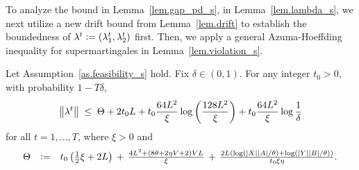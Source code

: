 \documentclass[12pt, final]{l4dc2023}
\begin{document}
To analyze the bound in Lemma~\ref{lem.gap_pd_s},  in Lemma~\ref{lem.lambda_s}, we next utilize a new drift bound from Lemma~\ref{lem.drift} to establish the boundedness of $\lambda^t \mathrel{\mathop:}= (\lambda_1^{t},\lambda_2^{t})$ first. Then, we apply a general Azuma-Hoeffding inequality for supermartingales in Lemma~\ref{lem.violation_s}. 

\begin{lemma}\label{lem.lambda_s}
	Let Assumption~\ref{as.feasibility_s} hold. 
	Fix $\delta\in (0,1)$. For any integer $t_0>0$, with probability $1-T\delta$,
	\[
	\left\|{\lambda^t}\right\| \; \leq\; \displaystyle \Theta + 2 t_0 L+ t_0 \frac{64 L^2}{\xi} \log \left(\frac{128 L^2}{\xi}\right) + t_0 \frac{64 L^2}{\xi} \log\frac{1}{\delta}
	\]
	for all $t = 1,\ldots,T$, where $\xi >0$ and
	\[
	\begin{array}{rcl}
	\Theta &\mathrel{\mathop:}=& t_0
	\left(\tfrac{1}{2}\xi  +2 L\right) \,+\,\tfrac{4L^2 + (8\theta +2\eta V
		+2 )VL}{\xi}
	\,+\,\tfrac{2L (\log(|X||A|/\theta)+\log(|Y||B|/\theta)) }{t_0\xi\eta}.
	\end{array}
	\]
\end{lemma}
\end{document}

